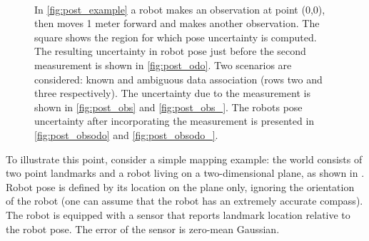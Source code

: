 \begin{figure}
\begin{center}
{\label{fig:post_obsodo}
}\\
\quad\space
{}
\end{center}
\caption[Robot pose uncertainty, example]{In \ref{fig:post_example} a
  robot makes an observation at point (0,0), then moves 1 meter
  forward and makes another observation. The square shows the region
  for which pose uncertainty is computed. The resulting uncertainty
  in robot pose just before the second measurement is shown in
  \ref{fig:post_odo}. Two scenarios are considered: known and
  ambiguous data association (rows two and three respectively).  The
  uncertainty due to the measurement is shown in \ref{fig:post_obs}
  and \ref{fig:post_obs_}. The robots pose uncertainty after
  incorporating the measurement is presented in \ref{fig:post_obsodo}
  and \ref{fig:post_obsodo_}.}\label{fig:post_all}
\end{figure}

To illustrate this point, consider a simple mapping example: the world
consists of two point landmarks and a robot living on a
two-dimensional plane, as shown in . Robot
pose is defined by its location on the plane only, ignoring the
orientation of the robot (one can assume that the robot has an
extremely accurate compass). The robot is equipped with a sensor that
reports landmark location relative to the robot pose. The error of the
sensor is zero-mean Gaussian.

